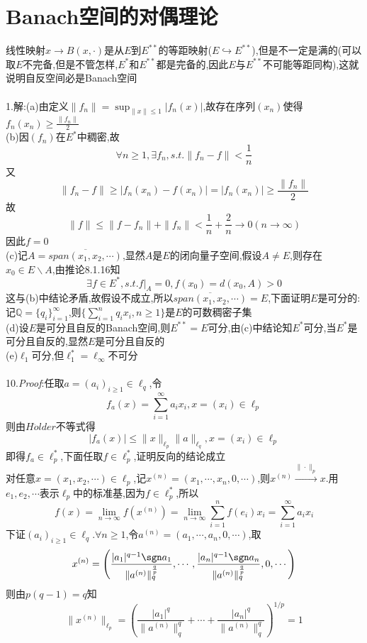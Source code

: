 \chapter{Banach空间的对偶理论}
线性映射$x\to B(x,\cdot)$是从$E$到$E^{**}$的等距映射($E\hookrightarrow E^{**}$),但是不一定是满的(可以取$E$不完备,但是不管怎样,$E^*$和$E^{**}$都是完备的,因此$E$与$E^{**}$不可能等距同构),这就说明自反空间必是Banach空间\\\\
1.解:(a)由定义$\|f_n\|=\sup_{\|x\|\leq1}|f_n(x)|$,故存在序列$(x_n)$使得$f_n(x_n)\geq\frac{\|f_n\|}{2}$\\
(b)因$(f_n)$在$E^*$中稠密,故\[\forall n\geq1,\exists f_n,s.t.\|f_n-f\|<\frac{1}{n}\]
又\[\|f_n-f\|\geq|f_n(x_n)-f(x_n)|=|f_n(x_n)|\geq\frac{\|f_n\|}{2}\]
故\[\|f\|\leq\|f-f_n\|+\|f_n\|<\frac{1}{n}+\frac{2}{n}\to0(n\to\infty)\]
因此$f=0$\\
(c)记$A=\overline{span(x_1,x_2,\cdots)}$,显然$A$是$E$的闭向量子空间,假设$A\neq E$,则存在$x_0\in E\backslash A$,由推论8.1.16知
\[\exists f\in E^*,s.t.f|_A=0,f(x_0)=d(x_0,A)>0\]
这与(b)中结论矛盾,故假设不成立,所以$\overline{span(x_1,x_2,\cdots)}=E$,下面证明$E$是可分的:\\
记$\mathbb{Q}=\{q_i\}_{i=1}^{\infty}$,则$\{\sum_{i=1}^nq_ix_i,n\geq1\}$是$E$的可数稠密子集\\
(d)设$E$是可分且自反的Banach空间,则$E^{**}=E$可分,由(c)中结论知$E^*$可分,当$E^*$是可分且自反的,显然$E$是可分且自反的\\
(e)$\ell_1$可分,但$\ell_1^*=\ell_{\infty}$不可分\\\\
10.\textit{Proof}:任取$a=(a_i)_{i\geq1}\in\ell_q$,令
\[f_a(x)=\sum_{i=1}^{\infty}a_ix_i,x=(x_i)\in\ell_p\]
则由$H\ddot{o}lder$不等式得
\[|f_a(x)|\leq\|x\|_{\ell_p}\|a\|_{\ell_q},x=(x_i)\in\ell_p\]
即得$f_a\in\ell_p^*$,下面任取$f\in\ell_p^*$,证明反向的结论成立\\
对任意$x=(x_1,x_2,\cdots)\in\ell_p$,记$x^{(n)}=(x_1,\cdots,x_n,0,\cdots)$,则$x^{(n)}\xrightarrow{\|\cdot\|_p}x$.用$e_1,e_2,\cdots$表示$\ell_p$中的标准基,因为$f\in\ell_p^*$,所以
\[f(x)=\lim_{n\to\infty}f(x^{(n)})=\lim_{n\to\infty}\sum_{i=1}^nf(e_i)x_i=\sum_{i=1}^{\infty}a_ix_i\]
下证$(a_i)_{i\geq1}\in\ell_q.\forall n\geq 1$,令$a^{(n)}=(a_1,\cdots,a_n,0,\cdots)$,取
\[x^{(n)}=\left(\frac{|a_1|^{q-1}\sgn a_1}{\|a^{(n)}\|^{\frac{q}{p}}_q},\cdots,\frac{|a_n|^{q-1}\sgn a_n}{\|a^{(n)}\|^{\frac{q}{p}}_q},0,\cdots\right)\]
则由$p(q-1)=q$知
\[\|x^{(n)}\|_{\ell_p}=\left(\frac{|a_1|^q}{\|a^{(n)}\|^q_q}+\cdots+\frac{|a_n|^q}{\|a^{(n)}\|^q_q}\right)^{1/p}=1\]
